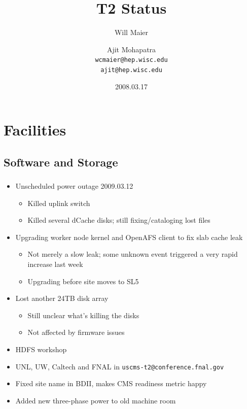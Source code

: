 \documentclass{beamer}
\title{T2 Status}
\author[Maier, Mohapatra]{
    Will Maier \and Ajit Mohapatra\\ 
    {\tt wcmaier@hep.wisc.edu}\\
    {\tt ajit@hep.wisc.edu}}
\institute[Wisconsin]{University of Wisconsin - High Energy Physics}
\date{2008.03.17}
\begin{document}
\begin{frame}
    \titlepage
\end{frame}


\section{Facilities}
\subsection{Software and Storage}
\begin{frame}
\frametitle{}
\begin{itemize}
    \item Unscheduled power outage 2009.03.12
    \begin{itemize}
        \item Killed uplink switch
        \item Killed several dCache disks; still fixing/cataloging lost files
    \end{itemize}
    \item Upgrading worker node kernel and OpenAFS client to fix slab cache leak
    \begin{itemize}
        \item Not merely a slow leak; some unknown event triggered a very rapid increase last week
        \item Upgrading before site moves to SL5
    \end{itemize}
    \item Lost another 24TB disk array
    \begin{itemize}
        \item Still unclear what's killing the disks
        \item Not affected by firmware issues
    \end{itemize}
    \item HDFS workshop
    \item UNL, UW, Caltech and FNAL in {\tt uscms-t2@conference.fnal.gov}
    \item Fixed site name in BDII, makes CMS readiness metric happy
    \item Added new three-phase power to old machine room
\end{itemize}
\end{frame}
\end{document}
